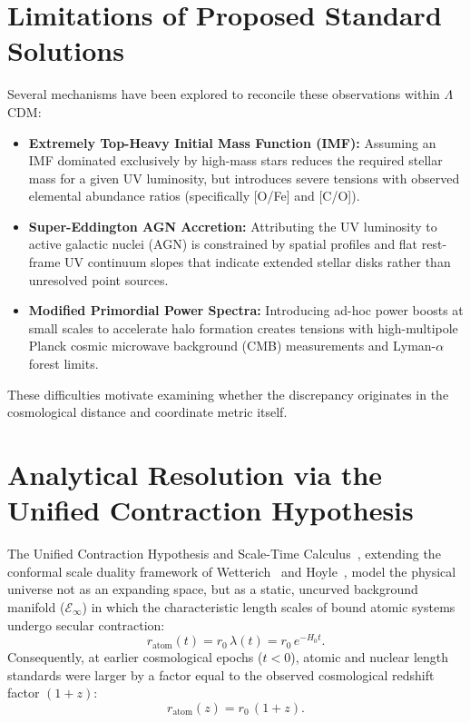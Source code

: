 \documentclass[11pt,a4paper]{article}
\begin{document}
\section{Limitations of Proposed Standard Solutions}
\label{sec:standard_limits}

Several mechanisms have been explored to reconcile these observations within $\Lambda$CDM:
\begin{itemize}
    \item \textbf{Extremely Top-Heavy Initial Mass Function (IMF):} Assuming an IMF dominated exclusively by high-mass stars reduces the required stellar mass for a given UV luminosity, but introduces severe tensions with observed elemental abundance ratios (specifically [O/Fe] and [C/O]).
    \item \textbf{Super-Eddington AGN Accretion:} Attributing the UV luminosity to active galactic nuclei (AGN) is constrained by spatial profiles and flat rest-frame UV continuum slopes that indicate extended stellar disks rather than unresolved point sources.
    \item \textbf{Modified Primordial Power Spectra:} Introducing ad-hoc power boosts at small scales to accelerate halo formation creates tensions with high-multipole Planck cosmic microwave background (CMB) measurements and Lyman-$\alpha$ forest limits.
\end{itemize}

These difficulties motivate examining whether the discrepancy originates in the cosmological distance and coordinate metric itself.

\section{Analytical Resolution via the Unified Contraction Hypothesis}
\label{sec:contraction_resolution}

The Unified Contraction Hypothesis and Scale-Time Calculus~\cite{haydari_main, haydari_scale}, extending the conformal scale duality framework of Wetterich~\cite{wetterich2013} and Hoyle~\cite{hoyle1964}, model the physical universe not as an expanding space, but as a static, uncurved background manifold ($\mathcal{E}_\infty$) in which the characteristic length scales of bound atomic systems undergo secular contraction:
\begin{equation}
    r_{\mathrm{atom}}(t) = r_0 \, \lambda(t) = r_0 \, e^{-H_0 t}.
    \label{eq:atom_contraction}
\end{equation}
Consequently, at earlier cosmological epochs ($t < 0$), atomic and nuclear length standards were larger by a factor equal to the observed cosmological redshift factor $(1+z)$:
\begin{equation}
    r_{\mathrm{atom}}(z) = r_0 \, (1 + z).
    \label{eq:past_atom_size}
\end{equation}
\end{document}
